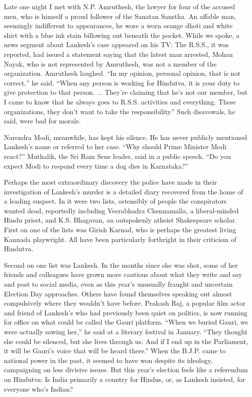 Late one night I met with N.P. Amruthesh, the lawyer for four of the
accused men, who is himself a proud follower of the Sanatan Sanstha. An
affable man, seemingly indifferent to appearances, he wore a worn orange
dhoti and white shirt with a blue ink stain billowing out beneath the
pocket. While we spoke, a news segment about Lankesh's case appeared on
his TV: The R.S.S., it was reported, had issued a statement saying that
the latest man arrested, Mohan Nayak, who is not represented by
Amruthesh, was not a member of the organization. Amruthesh laughed. ``In
my opinion, personal opinion, that is not correct,'' he said. ``When any
person is working for Hindutva, it is your duty to give protection to
that person. ... They're claiming that he's not our member, but I came
to know that he always goes to R.S.S. activities and everything. These
organizations, they don't want to take the responsibility.'' Such
disavowals, he said, were bad for morale.

Narendra Modi, meanwhile, has kept his silence. He has never publicly
mentioned Lankesh's name or referred to her case. ``Why should Prime
Minister Modi react?'' Muthalik, the Sri Ram Sene leader, said in a
public speech. ``Do you expect Modi to respond every time a dog dies in
Karnataka?''

Perhaps the most extraordinary discovery the police have made in their
investigation of Lankesh's murder is a detailed diary recovered from the
home of a leading suspect. In it were two lists, ostensibly of people
the conspirators wanted dead, reportedly including Veerabhadra
Chennamalla, a liberal-minded Hindu priest, and K.S. Bhagavan, an
outspokenly atheist Shakespeare scholar. First on one of the lists was
Girish Karnad, who is perhaps the greatest living Kannada playwright.
All have been particularly forthright in their criticism of Hindutva.

Second on one list was Lankesh. In the months since she was shot, some
of her friends and colleagues have grown more cautious about what they
write and say and post to social media, even as this year's unusually
fraught and uncertain Election Day approaches. Others have found
themselves speaking out almost compulsively where they wouldn't have
before. Prakash Raj, a popular film actor and friend of Lankesh's who
had previously been quiet on politics, is now running for office on what
could be called the Gauri platform. ``When we buried Gauri, we were
actually sowing her,'' he said at a literary festival in January. ``They
thought she could be silenced, but she lives through us. And if I end up
in the Parliament, it will be Gauri's voice that will be heard there.''
When the B.J.P. came to national power in the past, it seemed to have
won despite its ideology, campaigning on less divisive issues. But this
year's election feels like a referendum on Hindutva: Is India primarily
a country for Hindus, or, as Lankesh insisted, for everyone who's
Indian?

